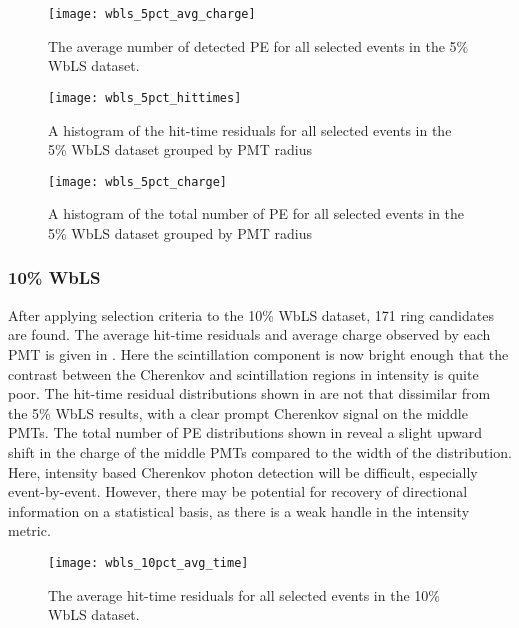 \begin{figure}
\centering
\texttt{[image: wbls\_5pct\_avg\_charge]}
\caption{\label{fig:wbls5pct_avg_charge}The average number of detected PE for all selected events in the 5\% WbLS dataset.}
\end{figure}

\begin{figure}
\centering
\texttt{[image: wbls\_5pct\_hittimes]}
\caption{\label{fig:wbls5pct_tresid}A histogram of the hit-time residuals for all selected events in the 5\% WbLS dataset grouped by PMT radius}
\end{figure}

\begin{figure}
\centering
\texttt{[image: wbls\_5pct\_charge]}
\caption{\label{fig:wbls5pct_totalq}A histogram of the total number of PE for all selected events in the 5\% WbLS dataset grouped by PMT radius}
\end{figure}

\clearpage

\subsubsection{10\% WbLS}

After applying selection criteria to the 10\% WbLS dataset, 171 ring candidates are found.
The average hit-time residuals and average charge observed by each PMT is given in .
Here the scintillation component is now bright enough that the contrast between the Cherenkov and scintillation regions in intensity is quite poor.
The hit-time residual distributions shown in  are not that dissimilar from the 5\% WbLS results, with a clear prompt Cherenkov signal on the middle PMTs.
The total number of PE distributions shown in  reveal a slight upward shift in the charge of the middle PMTs compared to the width of the distribution.
Here, intensity based Cherenkov photon detection will be difficult, especially event-by-event. 
However, there may be potential for recovery of directional information on a statistical basis, as there is a weak handle in the intensity metric.

\begin{figure}
\centering
\texttt{[image: wbls\_10pct\_avg\_time]}
\caption{\label{fig:wbls10pct_avg_time}The average hit-time residuals for all selected events in the 10\% WbLS dataset.}
\end{figure}

